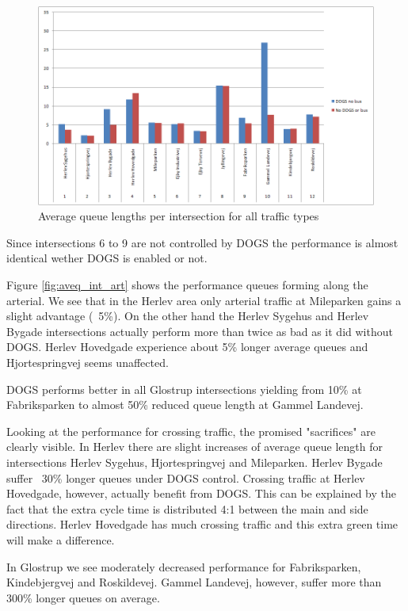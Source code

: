 \begin{figure}[ht]
\begin{center}
\includegraphics[scale=0.30]{aveq_intersection_total.png} 
\end{center}
\caption{Average queue lengths per intersection for all traffic types}
\label{fig:aveq_int_tot}
\end{figure}

Since intersections 6 to 9 are not controlled by DOGS the performance is almost identical wether DOGS is enabled or not. 

Figure \ref{fig:aveq_int_art} shows the performance queues forming along the arterial. We see that in the Herlev area only arterial traffic at Mileparken gains a slight advantage (~5\%). On the other hand the Herlev Sygehus and Herlev Bygade intersections actually perform more than twice as bad as it did without DOGS. Herlev Hovedgade experience about 5\% longer average queues and Hjortespringvej seems unaffected.

DOGS performs better in all Glostrup intersections yielding from 10\% at Fabriksparken to almost 50\% reduced queue length at Gammel Landevej.

Looking at the performance for crossing traffic, the promised "sacrifices" are clearly visible. In Herlev there are slight increases of average queue length for intersections Herlev Sygehus, Hjortespringvej and Mileparken. Herlev Bygade suffer ~30\% longer queues under DOGS control. Crossing traffic at Herlev Hovedgade, however, actually benefit from DOGS. This can be explained by the fact that the extra cycle time is distributed 4:1 between the main and side directions. Herlev Hovedgade has much crossing traffic and this extra green time will make a difference.

In Glostrup we see moderately decreased performance for Fabriksparken, Kindebjergvej and Roskildevej. Gammel Landevej, however, suffer more than 300\% longer queues on average.

